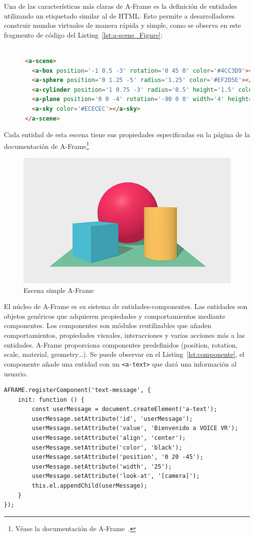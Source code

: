 \documentclass[a4paper, 12pt]{book}
\begin{document}
Una de las características más claras de A-Frame es la definición de entidades utilizando un etiquetado similar al de HTML. Esto permite a desarrolladores construir mundos virtuales de manera rápida y simple, como se observa en este fragmento de código del Listing~\ref{lst:a-scene_Figure}: 


\begin{lstlisting}[language=HTML, caption=Escena A-Frame básica, captionpos=b,label=lst:a-scene_Figure]

      <a-scene>
        <a-box position='-1 0.5 -3' rotation='0 45 0' color='#4CC3D9'></a-box>
        <a-sphere position='0 1.25 -5' radius='1.25' color='#EF2D5E'></a-sphere>
        <a-cylinder position='1 0.75 -3' radius='0.5' height='1.5' color='#FFC65D'></a-cylinder>
        <a-plane position='0 0 -4' rotation='-90 0 0' width='4' height='4' color='#7BC8A4'></a-plane>
        <a-sky color='#ECECEC'></a-sky>
      </a-scene>
\end{lstlisting}

Cada entidad de esta escena tiene sus propiedades especificadas en la página de la documentación de A-Frame\footnote{Véase la documentación de A-Frame~\cite{aframe2025docs}.}

\begin{figure}[H]
    \centering
    \includegraphics[width=0.5\linewidth]{img/SceneSimple.png}
    \caption{Escena simple A-Frame}
    \label{fig:aframe-scene}
\end{figure}

El núcleo de A-Frame es su sistema de entidades-componentes. Las entidades son objetos genéricos que adquieren propiedades y comportamientos mediante componentes. Los componentes son módulos reutilizables que añaden comportamientos, propiedades visuales, interacciones y varias acciones más a las entidades. A-Frame proporciona componentes predefinidos (position, rotation, scale, material, geometry\ldots). Se puede observar en el Listing~\ref{lst:componente}, el componente añade una entidad con un \texttt{<a-text>} que dará una información al usuario.

\begin{lstlisting}[language=HTML, caption=Crear Componente, captionpos=b, label=lst:componente]
  AFRAME.registerComponent('text-message', {
    init: function () {
        const userMessage = document.createElement('a-text');
        userMessage.setAttribute('id', 'userMessage');
        userMessage.setAttribute('value', 'Bienvenido a VOICE VR');
        userMessage.setAttribute('align', 'center');
        userMessage.setAttribute('color', 'black');
        userMessage.setAttribute('position', '0 20 -45');
        userMessage.setAttribute('width', '25');
        userMessage.setAttribute('look-at', '[camera]');
        this.el.appendChild(userMessage);
    }
});
\end{lstlisting}
\end{document}
